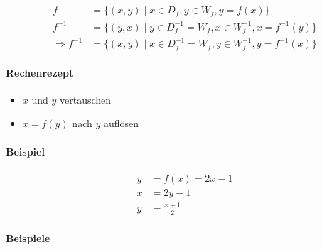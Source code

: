 \begin{align*}
    f &= \{ (x,y) \mid x \in D_f, y \in W_f, y = f(x) \} \\
    f^{-1} &= \{ (y,x) \mid y \in D_f^{-1} = W_f, x \in W_f^{-1}, x = f^{-1}(y) \} \\
    \Rightarrow f^{-1} &= \{ (x,y) \mid x \in D_f^{-1} = W_f, y \in W_f^{-1}, y = f^{-1}(x) \}
\end{align*}

\paragraph{Rechenrezept}

\begin{itemize}
    \item \(x\) und \(y\) vertauschen
    \item \(x = f(y)\) nach \(y\) auflösen
\end{itemize}

\paragraph{Beispiel}

\begin{align*}
    y &= f(x) = 2x - 1 \\
    x &= 2y - 1 \\
    y &= \frac{x + 1}{2}
\end{align*}

\begin{figure}[H]
    \centering
\end{figure}


\paragraph{Beispiele}

